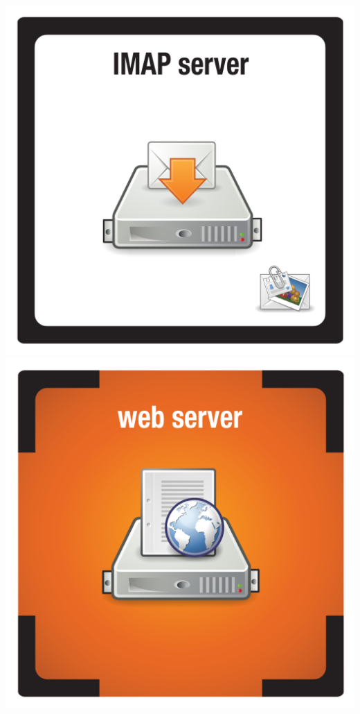 \documentclass{letter}
\begin{document}
\includegraphics{tiles/node_imap_server}
\includegraphics{tiles/node_web_server_compromised} \\
\end{document}
